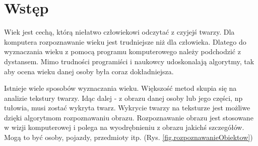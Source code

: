\documentclass[a4paper,twoside,12pt]{book}
\newcounter{stronyPozaNumeracja}
\begin{document}
    \vfill




    \cleardoublepage


    \pagestyle{tylkoNumeryStron}
    \tableofcontents

    \setcounter{stronyPozaNumeracja}{\value{page}}
    \mainmatter
    \pagestyle{NumeryStronNazwyRozdzialow}


    \chapter{Wstęp}

    Wiek jest cechą, którą niełatwo człowiekowi odczytać z czyjejś twarzy. Dla komputera rozpoznawanie wieku jest
    trudniejsze niż dla człowieka.
    Dlatego do wyznaczania wieku z pomocą programu komputerowego należy podchodzić z dystansem. Mimo trudności programiści
    i naukowcy udoskonalają algorytmy,
    tak aby ocena wieku danej osoby była coraz dokładniejsza.

    Istnieje wiele sposobów wyznaczania wieku.
    Większość metod skupia się na analizie tekstury twarzy. Idąc dalej - z obrazu danej osoby lub jego części, np tułowia,
    musi zostać wykryta twarz. Wykrycie twarzy na teksturze jest możliwe dzięki algorytmom rozpoznawaniu obrazu.
    Rozpoznawanie obrazu jest stosowane w wizji komputerowej i polega na wyodrębnieniu z obrazu jakichś szczegółów. Mogą
    to być osoby, pojazdy, przedmioty itp. (Rys. \ref{fig.rozpoznawanieObiektow})
\end{document}
